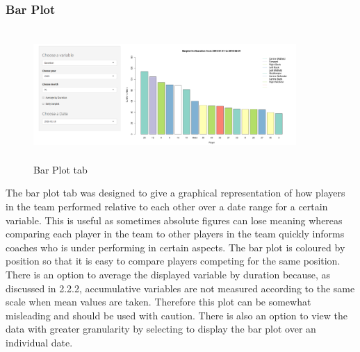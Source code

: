 \subsubsection{Bar Plot}
\begin{figure}
	\vspace{-2em}
	\includegraphics[height=5cm, width=10cm]{Images/BarplotTab.png}
	\caption{Bar Plot tab}
\end{figure}
The bar plot tab was designed to give a graphical representation of how players in the team performed relative to each other over a date range for a certain variable. This is useful as sometimes absolute figures can lose meaning whereas comparing each player in the team to other players in the team quickly informs coaches who is under performing in certain aspects. The bar plot is coloured by position so that it is easy to compare players competing for the same position. There is an option to average the displayed variable by duration because, as discussed in 2.2.2, accumulative variables are not measured according to the same scale when mean values are taken. Therefore this plot can be somewhat misleading and should be used with caution. There is also an option to view the data with greater granularity by selecting to display the bar plot over an individual date.

